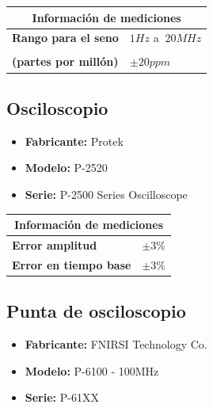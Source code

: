 
\begin{center}
    \renewcommand{\arraystretch}{1.2}
    \begin{tabular}{| m{4cm}| m{3cm} |}
        \hline
        \multicolumn{2}{|c|}{\textbf{Información de mediciones}} \\
        \hline
        {\centering\textbf{Rango para el seno}} &
        {$1Hz$ a $~20MHz$} \\
        \hline
        \shortstack{\textbf{Precisión} \\ \textbf{(partes por millón)}} &
        {$\pm 20ppm$} \\
        \hline
    \end{tabular}
\end{center}

\subsection{Osciloscopio}
\begin{itemize} 
    \item \textbf{Fabricante:} Protek
    \item \textbf{Modelo:} P-2520
    \item \textbf{Serie:} P-2500 Series Oscilloscope
\end{itemize} 

\begin{center}
    \renewcommand{\arraystretch}{1.2}
    \begin{tabular}{| m{4cm}| m{3cm} |}
        \hline
        \multicolumn{2}{|c|}{\textbf{Información de mediciones}} \\
        \hline
        {\centering\textbf{Error amplitud}} &
        {$\pm 3\%$} \\
        \hline
        \textbf{Error en tiempo base} &
        {$\pm 3\%$} \\
        \hline
    \end{tabular}
\end{center}

\columnbreak{}

\subsection{Punta de osciloscopio}
\begin{itemize} 
    \item \textbf{Fabricante:} FNIRSI Technology Co.
    \item \textbf{Modelo:} P-6100 - 100MHz
    \item \textbf{Serie:} P-61XX
\end{itemize} 


